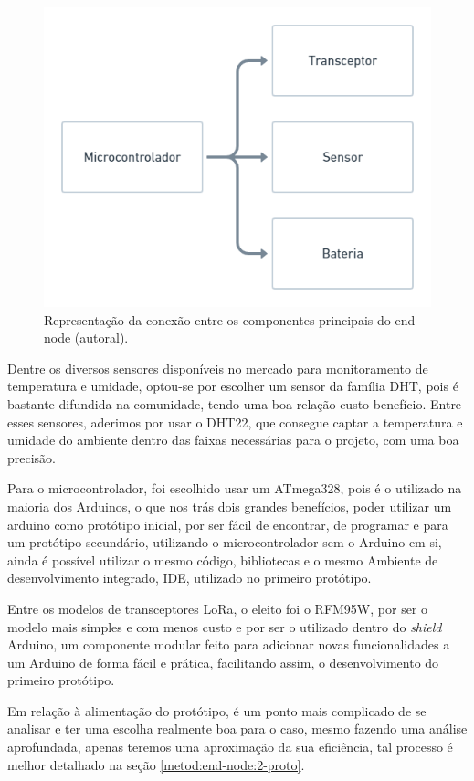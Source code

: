 \begin{figure}[H]
  \centering
  \includegraphics[width=.80\textwidth]{assets/end-node-schematic.png} 
  \caption{Representação da conexão entre os componentes principais do end node (autoral).}
  \label{fig:end-node-schematic} 
\end{figure}

Dentre os diversos sensores disponíveis no mercado para monitoramento de temperatura e umidade, optou-se por escolher um sensor da família DHT, pois é bastante difundida na comunidade, tendo uma boa relação custo benefício. Entre esses sensores, aderimos por usar o DHT22, que consegue captar a temperatura e umidade do ambiente dentro das faixas necessárias para o projeto, com uma boa precisão.

Para o microcontrolador, foi escolhido usar um ATmega328, pois é o utilizado na maioria dos Arduinos, o que nos trás dois grandes benefícios, poder utilizar um arduino como protótipo inicial, por ser fácil de encontrar, de programar e para um protótipo secundário, utilizando o microcontrolador sem o Arduino em si, ainda é possível utilizar o mesmo código, bibliotecas e o mesmo Ambiente de desenvolvimento integrado, IDE, utilizado no primeiro protótipo.

Entre os modelos de transceptores LoRa, o eleito foi o RFM95W, por ser o modelo mais simples e com menos custo e por ser o utilizado dentro do \textit{shield} Arduino, um componente modular feito para adicionar novas funcionalidades a um Arduino de forma fácil e prática, facilitando assim, o desenvolvimento do primeiro protótipo.

Em relação à alimentação do protótipo, é um ponto mais complicado de se analisar e ter uma escolha realmente boa para o caso, mesmo fazendo uma análise aprofundada, apenas teremos uma aproximação da sua eficiência, tal processo é melhor detalhado na seção \ref{metod:end-node:2-proto}.

